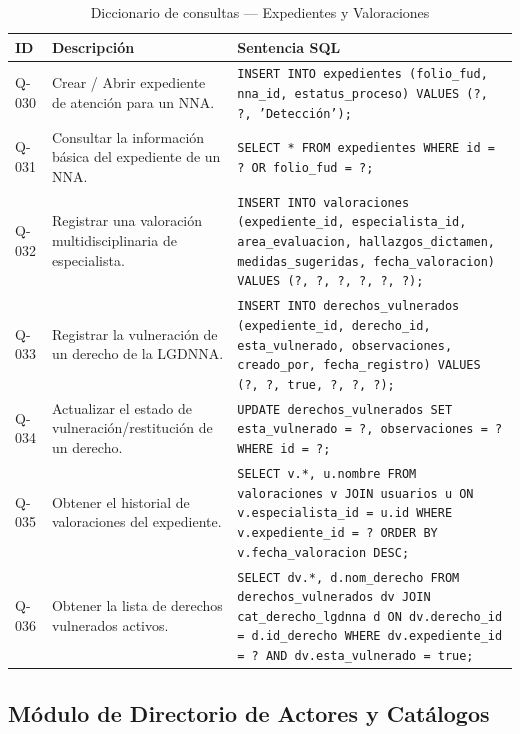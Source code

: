 \begin{table}[H]
	\centering
	\caption{Diccionario de consultas --- Expedientes y Valoraciones}
	\label{tab:consultas-expedientes}
	\footnotesize
	\begin{tabular}{l p{4.5cm} p{8.5cm}}
		\toprule
		\textbf{ID} & \textbf{Descripción} & \textbf{Sentencia SQL} \\
		\midrule
		Q-030 & Crear / Abrir expediente de atención para un NNA. & 
		\texttt{INSERT INTO expedientes (folio\_fud, nna\_id, estatus\_proceso) VALUES (?, ?, 'Detección');} \\
		\addlinespace
		Q-031 & Consultar la información básica del expediente de un NNA. & 
		\texttt{SELECT * FROM expedientes WHERE id = ? OR folio\_fud = ?;} \\
		\addlinespace
		Q-032 & Registrar una valoración multidisciplinaria de especialista. & 
		\texttt{INSERT INTO valoraciones (expediente\_id, especialista\_id, area\_evaluacion, hallazgos\_dictamen, medidas\_sugeridas, fecha\_valoracion) VALUES (?, ?, ?, ?, ?, ?);} \\
		\addlinespace
		Q-033 & Registrar la vulneración de un derecho de la LGDNNA. & 
		\texttt{INSERT INTO derechos\_vulnerados (expediente\_id, derecho\_id, esta\_vulnerado, observaciones, creado\_por, fecha\_registro) VALUES (?, ?, true, ?, ?, ?);} \\
		\addlinespace
		Q-034 & Actualizar el estado de vulneración/restitución de un derecho. & 
		\texttt{UPDATE derechos\_vulnerados SET esta\_vulnerado = ?, observaciones = ? WHERE id = ?;} \\
		\addlinespace
		Q-035 & Obtener el historial de valoraciones del expediente. & 
		\texttt{SELECT v.*, u.nombre FROM valoraciones v JOIN usuarios u ON v.especialista\_id = u.id WHERE v.expediente\_id = ? ORDER BY v.fecha\_valoracion DESC;} \\
		\addlinespace
		Q-036 & Obtener la lista de derechos vulnerados activos. & 
		\texttt{SELECT dv.*, d.nom\_derecho FROM derechos\_vulnerados dv JOIN cat\_derecho\_lgdnna d ON dv.derecho\_id = d.id\_derecho WHERE dv.expediente\_id = ? AND dv.esta\_vulnerado = true;} \\
		\bottomrule
	\end{tabular}
\end{table}

\subsection{Módulo de Directorio de Actores y Catálogos}

